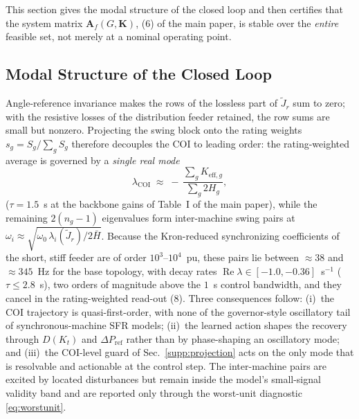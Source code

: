 \documentclass[lettersize,journal]{IEEEtran}
\begin{document}
This section gives the modal structure of the closed loop and then certifies that the system matrix $\mathbf{A}_f(G,\mathbf{K})$, (6) of the main paper, is stable over the \emph{entire} feasible set, not merely at a nominal operating point.

\subsection{Modal Structure of the Closed Loop}
\label{supp:modal}
Angle-reference invariance makes the rows of the lossless part of $\tilde J_r$ sum to zero; with the resistive losses of the distribution feeder retained, the row sums are small but nonzero. Projecting the swing block onto the rating weights $s_g=S_g/\sum_g S_g$ therefore decouples the COI to leading order: the rating-weighted average is governed by a \emph{single real mode}
\begin{equation}
  \lambda_{\mathrm{COI}}
   \;\approx\;
   -\,\frac{\sum_g K_{\mathrm{eff},g}}{\sum_g 2H_g},
  \label{eq:coi_mode}
\end{equation}
($\tau\!=\!1.5$~s at the backbone gains of Table~I of the main paper), while the remaining $2(n_g-1)$ eigenvalues form inter-machine swing pairs at
$\omega_i\approx\sqrt{\omega_0\,\lambda_i(\tilde J_r)/2\bar H}$. Because the Kron-reduced synchronizing coefficients of the short, stiff feeder are of order $10^3$--$10^4$~pu, these pairs lie between $\approx\!38$ and $\approx\!345$~Hz for the base topology, with decay rates $\operatorname{Re}\lambda\in[-1.0,-0.36]$~s$^{-1}$ ($\tau\le2.8$~s), two orders of magnitude above the $1$~s control bandwidth, and they cancel in the rating-weighted read-out (8). Three consequences follow: (i)~the COI trajectory is quasi-first-order, with none of the governor-style oscillatory tail of synchronous-machine SFR models; (ii)~the learned action shapes the recovery through $D(K_t)$ and $\Delta P_{\mathrm{ref}}$ rather than by phase-shaping an oscillatory mode; and (iii)~the COI-level guard of Sec.~\ref{supp:projection} acts on the only mode that is resolvable and actionable at the control step. The inter-machine pairs are excited by located disturbances but remain inside the model's small-signal validity band and are reported only through the worst-unit diagnostic \eqref{eq:worstunit}.
\end{document}
